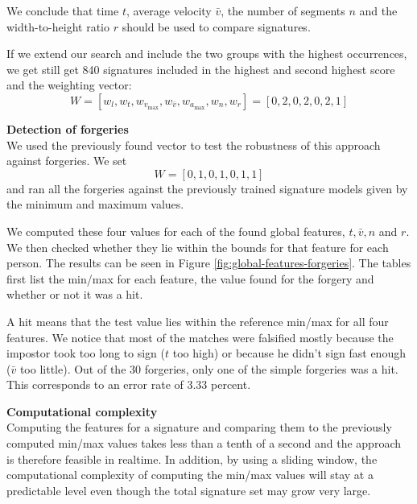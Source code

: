 \documentclass[a4paper, oneside]{csthesis}
\begin{document}
We conclude that time $t$, average velocity $\bar{v}$, the number of segments $n$ and the width-to-height ratio $r$ should be used to compare signatures.

If we extend our search and include the two groups with the highest occurrences, we get still get 840 signatures included in the highest and second highest score and the weighting vector:
$$W = [w_l, w_t, w_{v_\text{max}}, w_{\bar{v}}, w_{a_\text{max}}, w_n, w_r] = [0, 2, 0, 2, 0, 2, 1]$$


\noindent\textbf{Detection of forgeries}\\
We used the previously found vector to test the robustness of this approach against forgeries. We set $$W = [0, 1, 0, 1, 0, 1, 1]$$
and ran all the forgeries against the previously trained signature models given by the minimum and maximum values.

We computed these four values for each of the found global features, $t, \bar{v}, n$ and $r$. We then checked whether they lie within the bounds for that feature for each person. The results can be seen in Figure \ref{fig:global-features-forgeries}. The tables first list the min/max for each feature, the value found for the forgery and whether or not it was a hit.

A hit means that the test value lies within the reference min/max for all four features.
We notice that most of the matches were falsified mostly because the impostor took too long to sign ($t$ too high) or because he didn't sign fast enough ($\bar{v}$ too little). Out of the 30 forgeries, only one of the simple forgeries was a hit. This corresponds to an error rate of 3.33 percent.

\noindent\textbf{Computational complexity}\\
Computing the features for a signature and comparing them to the previously computed min/max values takes less than a tenth of a second and the approach is therefore feasible in realtime. In addition, by using a sliding window, the computational complexity of computing the min/max values will stay at a predictable level even though the total signature set may grow very large.
\end{document}
